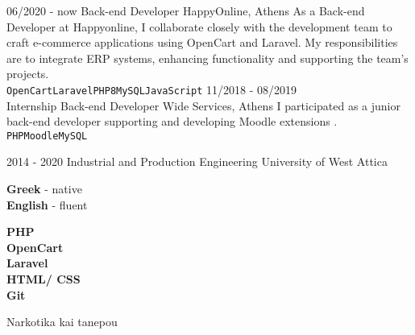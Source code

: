 \documentclass[10pt]{developercv}
\begin{document}


\begin{entrylist}
	\entry
		{06/2020 - now}
		{Back-end Developer}
		{HappyOnline, Athens}
		{As a Back-end Developer at Happyonline, I collaborate closely with the development team to craft e-commerce applications using OpenCart and Laravel. My responsibilities are to integrate ERP systems, enhancing functionality and supporting the team's projects.\\ \texttt{OpenCart}\slashsep\texttt{Laravel}\slashsep\texttt{PHP8}\slashsep\texttt{MySQL}\slashsep\texttt{JavaScript}}
	\entry
		{11/2018 - 08/2019\\\footnotesize{Internship}}
		{Back-end Developer}
		{Wide Services, Athens}
		{I participated as a junior back-end developer supporting and developing Moodle extensions .\\ \texttt{PHP}\slashsep\texttt{Moodle}\slashsep\texttt{MySQL}}
\end{entrylist}



\begin{entrylist}
	\entry
		{2014 - 2020}
		{Industrial and Production Engineering}
		{University of West Attica}
		{}
\end{entrylist}


\begin{minipage}[t]{0.3\textwidth}
	\vspace{-\baselineskip}
	\textbf{Greek} - native\\
	\textbf{English} - fluent\\
\end{minipage}
\hfill
\begin{minipage}[t]{0.3\textwidth}
	\vspace{-\baselineskip}
	\textbf{PHP}\\
	\textbf{OpenCart}\\
	\textbf{Laravel}\\
	\textbf{HTML/ CSS}\\
	\textbf{Git}\\
\end{minipage}
\hfill
\begin{minipage}[t]{0.3\textwidth}
	\vspace{-\baselineskip}	
	Narkotika kai tanepou\\
\end{minipage}

\end{document}
